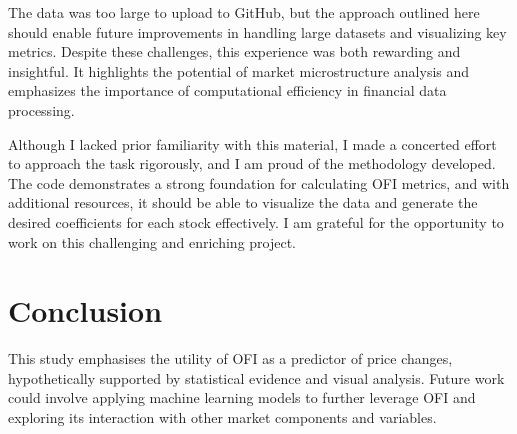 \documentclass[12pt]{article}
\begin{document}
The data was too large to upload to GitHub, but the approach outlined here should enable future improvements in handling large datasets and visualizing key metrics. Despite these challenges, this experience was both rewarding and insightful. It highlights the potential of market microstructure analysis and emphasizes the importance of computational efficiency in financial data processing.

Although I lacked prior familiarity with this material, I made a concerted effort to approach the task rigorously, and I am proud of the methodology developed. The code demonstrates a strong foundation for calculating OFI metrics, and with additional resources, it should be able to visualize the data and generate the desired coefficients for each stock effectively. I am grateful for the opportunity to work on this challenging and enriching project.


\section*{Conclusion}
This study emphasises the utility of OFI as a predictor of price changes, hypothetically supported by statistical evidence and visual analysis. Future work could involve applying machine learning models to further leverage OFI and exploring its interaction with other market components and variables.


\printbibliography[heading=bibintoc, title={References}]
\end{document}
